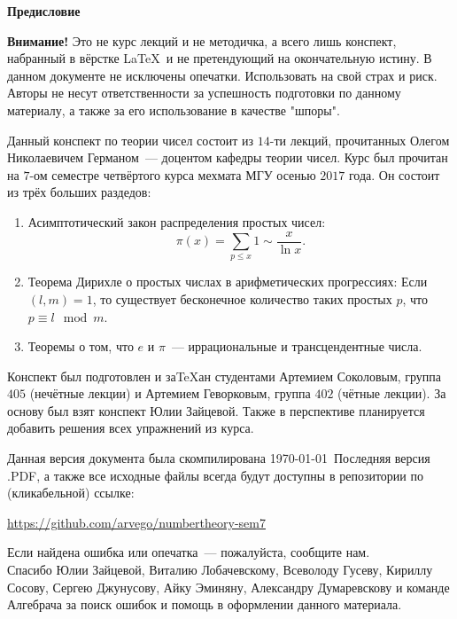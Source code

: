 \begin{center}
	\Large \bf{Предисловие}~\\
\end{center}

\tab \textbf{Внимание!} Это не курс лекций и не методичка, а всего лишь конспект, набранный в вёрстке \LaTeX~{}и не претендующий на окончательную истину. В данном документе не исключены опечатки. Использовать на свой страх и риск. Авторы не несут ответственности за успешность подготовки по данному материалу, а также за его использование в качестве "шпоры".

\tab Данный конспект по теории чисел состоит из $14$-ти лекций, прочитанных Олегом Николаевичем Германом — доцентом кафедры теории чисел. Курс был прочитан на $7$-ом семестре четвёртого курса мехмата МГУ осенью $2017$ года. Он состоит из трёх больших раздедов:
\begin{enumerate}[nolistsep]
	\item Асимптотический закон распределения простых чисел:
			$$\pi(x) = \sum_{p \leq x} 1 \sim \frac{x}{\ln x}.$$
	\item Теорема Дирихле о простых числах в арифметических прогрессиях:
			Если $(l, m) = 1$, то существует бесконечное количество таких простых $p$, что $p \equiv l \mod m$.
	\item Теоремы о том, что  $e$ и $\pi$ — иррациональные и трансцендентные числа.
\end{enumerate}

\tab Конспект был подготовлен и за\TeX ан студентами Артемием Соколовым, группа $405$ (нечётные лекции) и Артемием Геворковым, группа $402$ (чётные лекции). За основу был взят конспект Юлии Зайцевой. Также в перспективе планируется добавить решения всех упражнений из курса.

\tab Данная версия документа была скомпилирована \today~{}Последняя версия .PDF, а также все исходные файлы всегда будут доступны в репозитории по (кликабельной) ссылке:
\begin{center}
\href{https://github.com/arvego/numbertheory-sem7}{https://github.com/arvego/numbertheory-sem7}
\end{center}
Если найдена ошибка или опечатка — пожалуйста, сообщите нам.\\



\tab Спасибо Юлии Зайцевой, Виталию Лобачевскому, Всеволоду Гусеву, Кириллу Сосову, Сергею Джунусову, Айку Эминяну, Александру Думаревскову и команде Алгебрача за поиск ошибок и помощь в оформлении данного материала.